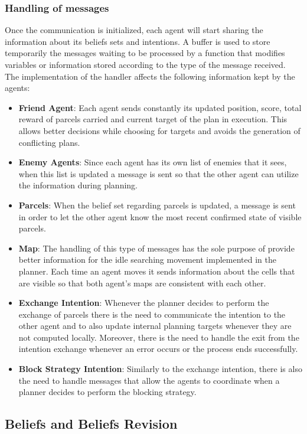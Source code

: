 \documentclass[a4paper, 11pt]{article}
\begin{document}
\subsubsection{Handling of messages}
Once the communication is initialized, each agent will start sharing the information about its beliefs sets and intentions. A buffer is used to store temporarily the messages waiting to be processed by a function that modifies variables or information stored according to the type of the message received. The implementation of the handler affects the following information kept by the agents:
\begin{itemize}
\item \textbf{Friend Agent}: Each agent sends constantly its updated position, score, total reward of parcels carried and current target of the plan in execution. This allows better decisions while choosing for targets and avoids the generation of conflicting plans.
\item \textbf{Enemy Agents}: Since each agent has its own list of enemies that it sees, when this list is updated a message is sent so that the other agent can utilize the information during planning.
\item \textbf{Parcels}: When the belief set regarding parcels is updated, a message is sent in order to let the other agent know the most recent confirmed state of visible parcels.
\item \textbf{Map}: The handling of this type of messages has the sole purpose of provide better information for the idle searching movement implemented in the planner. Each time an agent moves it sends information about the cells that are visible so that both agent's maps are consistent with each other.
\item \textbf{Exchange Intention}: Whenever the planner decides to perform the exchange of parcels there is the need to communicate the intention to the other agent and to also update internal planning targets whenever they are not computed locally. Moreover, there is the need to handle the exit from the intention exchange whenever an error occurs or the process ends successfully.
\item \textbf{Block Strategy Intention}: Similarly to the exchange intention, there is also the need to handle messages that allow the agents to coordinate when a planner decides to perform the blocking strategy.
\end{itemize}

\subsection{Beliefs and Beliefs Revision}
\end{document}
